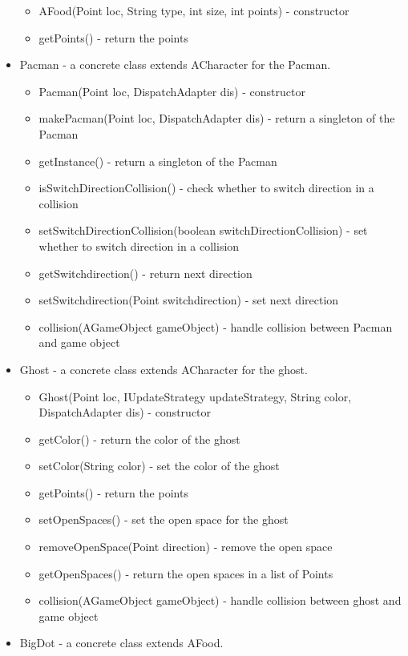 \documentclass[letterpaper, 11pt]{article}
\begin{document}
\begin{itemize}
\begin{itemize}
  \item AFood(Point loc, String type, int size, int points) - constructor
  \item getPoints() - return the points
  \end{itemize}
  \item Pacman - a concrete class extends ACharacter for the Pacman. 
  \begin{itemize}
  \item Pacman(Point loc, DispatchAdapter dis) - constructor
  \item makePacman(Point loc, DispatchAdapter dis) - return a singleton of the Pacman
  \item getInstance() - return a singleton of the Pacman
  \item isSwitchDirectionCollision() - check whether to switch direction in a collision
  \item setSwitchDirectionCollision(boolean switchDirectionCollision) - set whether to switch direction in a collision
  \item getSwitchdirection() - return next direction
  \item setSwitchdirection(Point switchdirection) - set next direction
  \item collision(AGameObject gameObject) - handle collision between Pacman and game object
   \end{itemize}
    \item Ghost - a concrete class extends ACharacter for the ghost. 
  \begin{itemize}
  \item Ghost(Point loc, IUpdateStrategy updateStrategy, String color, DispatchAdapter dis) - constructor
   \item getColor() - return the color of the ghost
   \item setColor(String color) - set the color of the ghost
   \item getPoints() - return the points
   \item setOpenSpaces() - set the open space for the ghost
   \item removeOpenSpace(Point direction) - remove the open space
   \item getOpenSpaces() - return the open spaces in a list of Points
  \item collision(AGameObject gameObject) - handle collision between ghost and game object
   \end{itemize}
  \item BigDot - a concrete class extends AFood.

\end{itemize}
\end{document}
